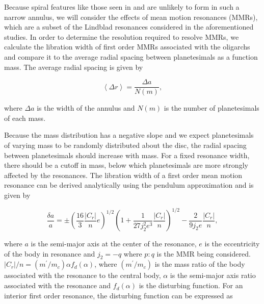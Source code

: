 Because spiral features like those seen in \cite{weinberg07a, weinberg07b} and \cite{cionco02} are unlikely to form in such a 
narrow annulus, we will consider the effects of mean motion resonances (MMRs), which are a subset of the Lindblad resonances 
considered in the aforementioned studies. In order to determine the resolution required to resolve MMRs, we calculate the 
libration width of first order MMRs associated with the oligarchs and compare it to the average radial spacing between 
planetesimals as a function mass. The average radial spacing is given by

\begin{equation}\label{eq:spacing}
\left< \Delta r \right> = \frac{\Delta a}{N(m)},
\end{equation}

\noindent where $\Delta a$ is the width of the annulus and $N(m)$ is the number of planetesimals of each mass.

Because the mass distribution has a negative slope and we expect planetesimals of varying mass to be randomly distributed 
about the disc, the radial spacing between planetesimals should increase with mass. For a fixed resonance width, there should 
be a cutoff in mass, below which planetesimals are more strongly affected by the resonances. The libration width of a first order 
mean motion resonance can be derived analytically using the pendulum approximation \cite{murray00} and is given by

\begin{equation}\label{eq:lib_width}
\frac{\delta a}{a} = \pm \left(\frac{16}{3} \frac{\left| C_{r} \right|}{n} e \right)^{1/2} \left(  1 + \frac{1}{27 j_{2}^2 e^3} \frac{\left| C_{r} \right|}{n} \right)^{1/2} - \frac{2}{9 j_{2} e}  \frac{\left| C_{r} \right|}{n},
\end{equation}


\noindent where $a$ is the semi-major axis at the center of the resonance, $e$ is the eccentricity of the body in resonance and 
$j_2 = -q$ where $p:q$ is the MMR being considered. $\left| C_{r} \right|/n = (m^{\prime}/m_{c}) \alpha f_{d}(\alpha)$, where $
(m^{\prime}/m_{c})$ is the mass ratio of the body associated with the resonance to the central body, $\alpha$ is the semi-major 
axis ratio associated with the resonance and $f_{d}(\alpha)$ is the disturbing function. For an interior first order resonance, the 
disturbing function can be expressed as

